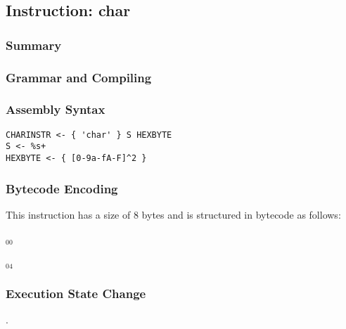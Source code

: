 \subsection{Instruction: char}

\subsubsection{Summary}


\subsubsection{Grammar and Compiling}


\subsubsection{Assembly Syntax}

\begin{myquote}
\begin{verbatim}
CHARINSTR <- { 'char' } S HEXBYTE
S <- %s+
HEXBYTE <- { [0-9a-fA-F]^2 }
\end{verbatim}
\end{myquote}


\subsubsection{Bytecode Encoding}

This instruction has a size of 8 bytes and is structured in bytecode as follows:

$_{00}$\ 



$_{04}$\ 


\subsubsection{Execution State Change}

.


